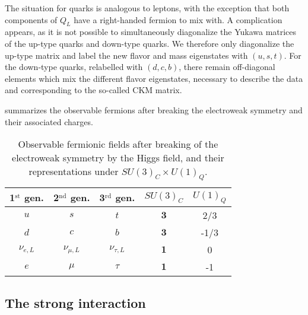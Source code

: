     The situation for quarks is analogous to leptons, with the exception that
    both components of $Q_L$ have a right-handed fermion to mix with. A
    complication appears, as it is not possible to simultaneously diagonalize
    the Yukawa matrices of the up-type quarks and down-type quarks. We therefore
    only diagonalize the up-type matrix and label the new flavor and mass
    eigenstates with $(u,s,t)$. For the down-type quarks, relabelled with
    $(d,c,b)$, there remain off-diagonal elements which mix the different flavor
    eigenstates, necessary to describe the data and corresponding to the
    so-called CKM matrix.

     summarizes the
    observable fermions after breaking the electroweak symmetry and their
    associated charges.

    \begin{table}[h]
        \centering
        \begin{tabular}{|ccc||cc|}
            \hline
            1$^\text{st}$ gen. & 2$^\text{nd}$ gen. & 3$^\text{rd}$ gen.  & $SU(3)_C$ & $U(1)_Q$  \\
            \hline
            \hline
            $u$                & $s$                & $t$                 & $\mathbf{3}$ &  2/3 \\
            $d$                & $c$                & $b$                 & $\mathbf{3}$ & -1/3 \\
            \hline
            \hline
            $\nu_{e,L}$        & $\nu_{\mu,L}$      & $\nu_{\tau,L}$      & $\mathbf{1}$ &  0   \\
            $e$                & $\mu$              & $\tau$              & $\mathbf{1}$ & -1   \\
            \hline
        \end{tabular}
        \caption{Observable fermionic fields after breaking of the electroweak symmetry
        by the Higgs field, and their representations under $SU(3)_C \times U(1)_Q$.}
        \label{tab:StandardModelFieldsAfterElectroweakBreaking}
    \end{table}

    \subsection{The strong interaction \label{sec:strongInteraction}}

